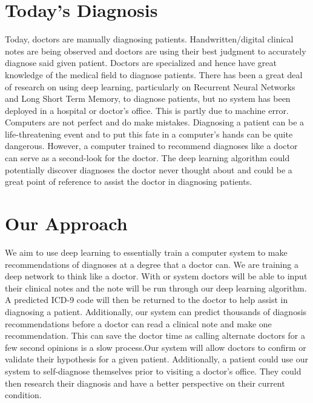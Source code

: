 \documentclass{article}
\begin{document}
\section{Today's Diagnosis}
Today, doctors are manually diagnosing patients. Handwritten/digital clinical notes are being observed and doctors are using their best judgment to accurately diagnose said given patient. Doctors are specialized and hence have great knowledge of the medical field to diagnose patients. There has been a great deal of research on using deep learning, particularly on Recurrent Neural Networks and Long Short Term Memory, to diagnose patients, but no system has been deployed in a hospital or doctor's office. This is partly due to machine error. Computers are not perfect and do make mistakes. Diagnosing a patient can be a life-threatening event and to put this fate in a computer's hands can be quite dangerous. However, a computer trained to recommend diagnoses like a doctor can serve as a second-look for the doctor. The deep learning algorithm could potentially discover diagnoses the doctor never thought about and could be a great point of reference to assist the doctor in diagnosing patients.

\section{Our Approach}
We aim to use deep learning to essentially train a computer system to make recommendations of diagnoses at a degree that a doctor can.  We are training a deep network to think like a doctor. With or system doctors will be able to input their clinical notes and the note will be run through our deep learning algorithm. A predicted ICD-9 code will then be returned to the doctor to help assist in diagnosing a patient. Additionally, our system can predict thousands of diagnosis recommendations before a doctor can read a clinical note and make one recommendation. This can save the doctor time as calling alternate doctors for a few second opinions is a slow process.Our system will allow doctors to confirm or validate their hypothesis for a given patient. Additionally, a patient could use our system to self-diagnose themselves prior to visiting a doctor's office. They could then research their diagnosis and have a better perspective on their current condition. 
\end{document}
